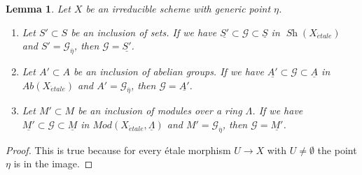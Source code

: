 \documentclass[10pt,a4paper]{amsart}
\theoremstyle{plain}
\newtheorem{lemma}[subsection]{Lemma}
\theoremstyle{definition}
\theoremstyle{remark}
\numberwithin{equation}{subsection}
\def\Sh{\mathop{\mathit{Sh}}\nolimits}
\def\etale{{\acute{e}tale}}
\begin{document}
\begin{lemma}
\label{lemma-irreducible-subsheaf-constant-zero}
Let $X$ be an irreducible scheme with generic point $\eta$.
\begin{enumerate}
\item Let $S' \subset S$ be an inclusion of sets. If we have
$\underline{S'} \subset \mathcal{G} \subset \underline{S}$
in $\Sh(X_\etale)$ and $S' = \mathcal{G}_{\overline{\eta}}$, then
$\mathcal{G} = \underline{S'}$.
\item Let $A' \subset A$ be an inclusion of abelian groups. If we have
$\underline{A'} \subset \mathcal{G} \subset \underline{A}$
in $\textit{Ab}(X_\etale)$ and $A' = \mathcal{G}_{\overline{\eta}}$, then
$\mathcal{G} = \underline{A'}$.
\item Let $M' \subset M$ be an inclusion of modules over a ring $\Lambda$.
If we have $\underline{M'} \subset \mathcal{G} \subset \underline{M}$
in $\textit{Mod}(X_\etale, \underline{\Lambda})$
and $M' = \mathcal{G}_{\overline{\eta}}$, then
$\mathcal{G} = \underline{M'}$.
\end{enumerate}
\end{lemma}

\begin{proof}
This is true because for every \'etale morphism $U \to X$
with $U \not = \emptyset$ the point $\eta$ is in the image.
\end{proof}
\end{document}
